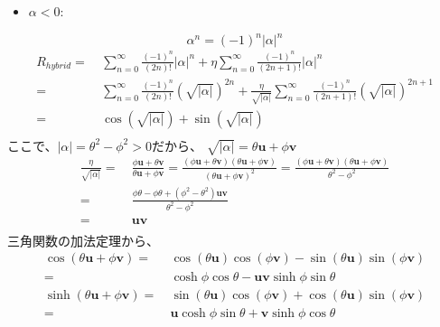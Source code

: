 \documentclass[a4paper,12pt,notitlepage]{jsreport}
\begin{document}
\begin{itemize}
  \item $ \alpha < 0 : $
\end{itemize}
\begin{equation}
  \alpha^n = (-1)^n |\alpha|^n
\end{equation}
\begin{equation}
  \begin{split}
    R_{hybrid} = ~ & \sum_{n=0}^{∞} \frac{(-1)^n}{(2n)!} |\alpha|^n
    + \eta \sum_{n=0}^{∞} \frac{(-1)^n}{(2n + 1)!} |\alpha|^n \\
    = ~ & \sum_{n=0}^{∞} \frac{(-1)^n}{(2n)!} (\sqrt{|\alpha|})^{2n}
    + \frac{\eta}{\sqrt{|\alpha|}} \sum_{n=0}^{∞} \frac{(-1)^n}{(2n + 1)!} (\sqrt{|\alpha|})^{2n + 1} \\
    = ~ & \cos(\sqrt{|\alpha|}) + \sin(\sqrt{|\alpha|}) \\
  \end{split}
\end{equation}
ここで、$ |\alpha| = \theta^2 - \phi^2 > 0 $だから、
$ \sqrt{|\alpha|} = \theta \bm{u} + \phi \bm{v} $
\begin{equation}
  \begin{split}
    \frac{\eta}{\sqrt{|\alpha|}} = ~ & \frac{\phi \bm{u} + \theta \bm{v}}{\theta \bm{u} + \phi \bm{v}}
    = \frac{(\phi \bm{u} + \theta \bm{v})(\theta \bm{u} + \phi \bm{v})}{(\theta \bm{u} + \phi \bm{v})^2}
    = \frac{(\phi \bm{u} + \theta \bm{v})(\theta \bm{u} + \phi \bm{v})}{\theta^2 - \phi^2} \\
    = ~ & \frac{\phi \theta - \phi \theta + (\phi^2 - \theta^2) \bm{u} \bm{v}}{\theta^2 - \phi^2} \\
    = ~ & \bm{u} \bm{v} \\
  \end{split}
\end{equation}
三角関数の加法定理から、
\begin{equation}
  \begin{split}
    \cos(\theta \bm{u} + \phi \bm{v})
    = ~ & \cos(\theta \bm{u}) \cos(\phi \bm{v}) - \sin(\theta \bm{u}) \sin(\phi \bm{v}) \\
    = ~ & \cosh \phi \cos \theta - \bm{u} \bm{v} \sinh \phi \sin \theta \\
    \sinh(\theta \bm{u} + \phi \bm{v})
    = ~ & \sin(\theta \bm{u}) \cos(\phi \bm{v}) + \cos(\theta \bm{u}) \sin(\phi \bm{v}) \\
    = ~ & \bm{u} \cosh \phi \sin \theta + \bm{v} \sinh \phi \cos \theta \\
  \end{split}
\end{equation}
\end{document}
